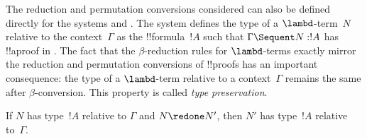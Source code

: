 \documentclass[../../../include/open-logic-section]{subfiles}
\begin{document}


The reduction and permutation conversions considered can also be
defined directly for the systems  and . The system
 defines the type of a $\lambd$-term~$N$ relative to the
context~$\Gamma$ as the !!{formula}~$!A$ such that $\Gamma \Sequent N
: !A$ has !!a{proof} in . The fact that the
$\beta$-reduction rules for $\lambd$-terms exactly mirror the
reduction and permutation conversions of !!{proof}s has an important
consequence: the type of a $\lambd$-term relative to a
context~$\Gamma$ remains the same after $\beta$-conversion. This
property is called \emph{type preservation}.

\begin{prop}
If $N$ has type~$!A$ relative
to $\Gamma$ and $N \redone N'$, then $N'$ has type~$!A$ relative to~$\Gamma$.
\end{prop}
\end{document}
